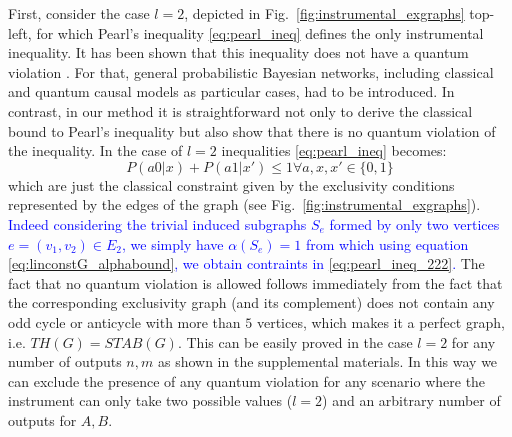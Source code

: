 \documentclass[letterpaper]{article}
\begin{document}
First, consider the case $l=2$, depicted in
Fig.~\ref{fig:instrumental_exgraphs} top-left, for which Pearl's
inequality \eqref{eq:pearl_ineq} defines the only instrumental inequality.
It has been shown that this inequality does not have a quantum violation
\cite{henson2014}.
For that, general probabilistic Bayesian networks, including classical and
quantum causal models as particular cases, had to be introduced.
In contrast, in our method it is straightforward not only to derive the
classical bound to Pearl's inequality but also show that there is no quantum
violation of the inequality.
In the case of $l=2$ inequalities \eqref{eq:pearl_ineq} becomes:
\begin{equation}
    P(a0|x) + P(a1|x') \le 1 \forall a,x,x' \in \{0,1\} 
    \label{eq:pearl_ineq_222}
\end{equation}
which are just the classical constraint given by the exclusivity conditions
represented by the edges of the graph (see Fig.~\ref{fig:instrumental_exgraphs}).
\textcolor{blue}{
Indeed considering the trivial induced subgraphs $S_e$ formed by only two vertices
$e = (v_1, v_2) \in E_2$, we simply have $\alpha(S_e) = 1$ from which using equation
\eqref{eq:linconstG_alphabound}, we obtain contraints in \eqref{eq:pearl_ineq_222}.
}
The fact that no quantum violation is allowed follows immediately from the fact
that the corresponding  exclusivity graph (and its complement) does not contain
any odd cycle or anticycle with more than $5$ vertices, which makes it a perfect
graph, i.e. $TH(G) = STAB(G)$. This can be easily proved in the case $l=2$ for any number of
outputs $n,m$ as shown in the supplemental materials. In this way we can exclude the
presence of any quantum violation for any scenario where the instrument can only
take two possible values ($l=2$) and an arbitrary number of outputs for $A, B$.
\end{document}
